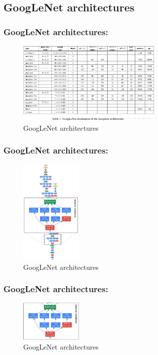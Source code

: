 \documentclass{beamer}
\begin{document}
\subsection{GoogLeNet architectures}
    \begin{frame}
    \frametitle{GoogLeNet architectures: }
         \begin{figure}[H]
            \begin{center}
                \includegraphics[width=7cm]{table13-3}
            \end{center}
        \caption{GoogLeNet architectures}
        \end{figure}
    \end{frame}

    \begin{frame}
    \frametitle{GoogLeNet architectures: }
         \begin{figure}[H]
            \begin{center}
                \includegraphics[width=3cm]{FIGURE13-3.png}
            \end{center}
        \caption{GoogLeNet architectures}
        \end{figure}
    \end{frame}
    \begin{frame}
    \frametitle{GoogLeNet architectures: }
         \begin{figure}[H]
            \begin{center}
                \includegraphics[width=3cm]{FIGURE13-11.png}
            \end{center}
        \caption{GoogLeNet architectures}
        \end{figure}
    \end{frame}
\end{document}
